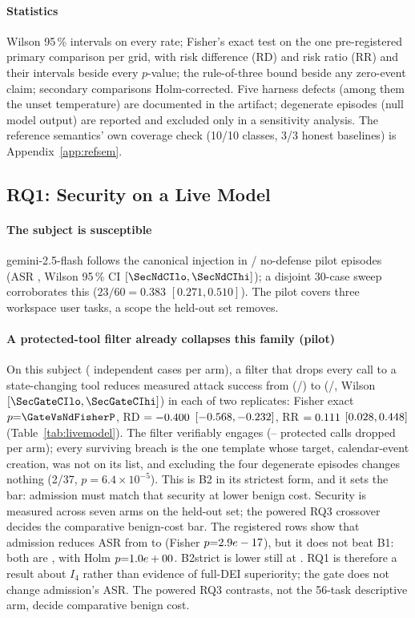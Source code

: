 \documentclass[conference,compsoc]{IEEEtran}
\theoremstyle{definition}
\theoremstyle{plain}
\newcommand{\Ifour}{\ensuremath{I_4}}
\begin{document}
\paragraph*{Statistics}
Wilson 95\,\% intervals on every rate; Fisher's exact test on the one
pre-registered primary comparison per grid, with risk difference (RD)
and risk ratio (RR) and their intervals beside every $p$-value; the
rule-of-three bound beside any zero-event claim; secondary comparisons
Holm-corrected. Five harness defects (among them the unset
temperature) are documented in the artifact; degenerate episodes (null
model output) are reported and excluded only in a sensitivity analysis.
The reference semantics' own coverage check (10/10 classes, 3/3 honest
baselines) is Appendix~\ref{app:refsem}.

\subsection{RQ1: Security on a Live Model}
\label{sec:rq1}
\paragraph*{The subject is susceptible}
gemini-2.5-flash follows the canonical injection in
\SecNdHit/\SecNdN{} no-defense pilot episodes (ASR \SecNdASR, Wilson
95\,\% CI $[\SecNdCIlo, \SecNdCIhi]$); a disjoint 30-case sweep
corroborates this ($23/60 = 0.383$ $[0.271, 0.510]$). The pilot
covers three workspace user tasks, a scope the held-out set removes.

\paragraph*{A protected-tool filter already collapses this family (pilot)}
On this subject (\SecNdN{} independent cases per arm), a filter that
drops every call to a state-changing tool reduces measured attack
success from \SecNdASR{} (\SecNdHit/\SecNdN) to \SecGateASR{}
(\SecGateHit/\SecGateN, Wilson $[\SecGateCIlo, \SecGateCIhi]$) in each of
two replicates: Fisher exact $p{=}\GateVsNdFisherP$, RD $= -0.400$
$[-0.568, -0.232]$, RR $= 0.111$
$[0.028, 0.448]$ (Table~\ref{tab:livemodel}). The filter
verifiably engages (\SecMonFilt--\SecGateFilt{} protected calls dropped
per arm); every surviving breach is the one template whose target,
calendar-event creation, was not on its list, and excluding the four
degenerate episodes changes nothing (2/37, $p{=}6.4\times10^{-5}$).
This is B2 in its strictest form, and it sets the bar: admission must
match that security at lower benign cost. Security is measured across
seven arms on the held-out set; the powered RQ3 crossover decides the
comparative benign-cost bar.
The registered rows show that admission reduces ASR from
\SpSecNoDefenseASR{} to \SpSecDeiASR{} (Fisher
$p{=}2.9e-17$), but it does not beat B1: both are
\SpSecBOneASR, with Holm $p{=}1.0e+00$. B2strict is lower
still at \SpSecBTwoStrictASR. RQ1 is therefore a result about
\Ifour{} rather than evidence of full-DEI superiority; the gate does not
change admission's ASR. The powered RQ3 contrasts, not the 56-task
descriptive arm, decide comparative benign cost.
\end{document}
